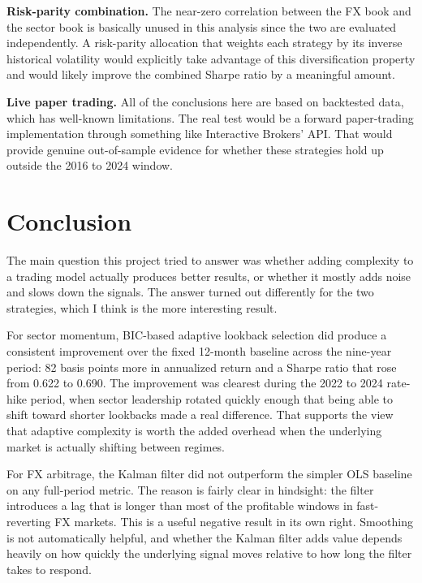 \documentclass[12pt]{article}
\begin{document}
\textbf{Risk-parity combination.} The near-zero correlation between the FX book and the sector book is basically unused in this analysis since the two are evaluated independently. A risk-parity allocation that weights each strategy by its inverse historical volatility would explicitly take advantage of this diversification property and would likely improve the combined Sharpe ratio by a meaningful amount.

\textbf{Live paper trading.} All of the conclusions here are based on backtested data, which has well-known limitations. The real test would be a forward paper-trading implementation through something like Interactive Brokers' API. That would provide genuine out-of-sample evidence for whether these strategies hold up outside the 2016 to 2024 window.

\section{Conclusion}

The main question this project tried to answer was whether adding complexity to a trading model actually produces better results, or whether it mostly adds noise and slows down the signals. The answer turned out differently for the two strategies, which I think is the more interesting result.

For sector momentum, BIC-based adaptive lookback selection did produce a consistent improvement over the fixed 12-month baseline across the nine-year period: 82 basis points more in annualized return and a Sharpe ratio that rose from 0.622 to 0.690. The improvement was clearest during the 2022 to 2024 rate-hike period, when sector leadership rotated quickly enough that being able to shift toward shorter lookbacks made a real difference. That supports the view that adaptive complexity is worth the added overhead when the underlying market is actually shifting between regimes.

For FX arbitrage, the Kalman filter did not outperform the simpler OLS baseline on any full-period metric. The reason is fairly clear in hindsight: the filter introduces a lag that is longer than most of the profitable windows in fast-reverting FX markets. This is a useful negative result in its own right. Smoothing is not automatically helpful, and whether the Kalman filter adds value depends heavily on how quickly the underlying signal moves relative to how long the filter takes to respond.
\end{document}
